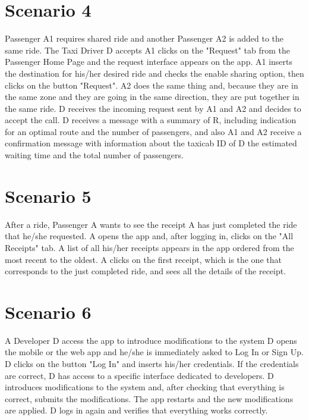 \section{Scenario 4}
Passenger A1 requires shared ride and another Passenger A2 is added to the same ride. The Taxi Driver D accepts A1 clicks on the "Request" tab from the Passenger Home Page and the request interface appears on the app. A1 inserts the destination for his/her desired ride and checks the enable sharing option, then clicks on the button "Request". A2 does the same thing and, because they are in the same zone and they are going in the same direction, they are put together in the same ride. D receives the incoming request sent by A1 and A2 and decides to accept the call. D receives a message with a summary of R, including indication for an optimal route and the number of passengers, and also A1 and A2 receive a confirmation message with information about the taxicab ID of D the estimated waiting time and the total number of passengers.

\section{Scenario 5}
After a ride, Passenger A wants to see the receipt A has just completed the ride that he/she requested. A opens the app and, after logging in, clicks on the "All Receipts" tab. A list of all his/her receipts appears in the app ordered from the most recent to the oldest. A clicks on the first receipt, which is the one that corresponds to the just completed ride, and sees all the details of the receipt.

\section{Scenario 6}
A Developer D access the app to introduce modifications to the system D opens the mobile or the web app and he/she is immediately asked to Log In or Sign Up. D clicks on the button "Log In" and inserts his/her credentials. If the credentials are correct, D has access to a specific interface dedicated to developers. D introduces modifications to the system and, after checking that everything is correct, submits the modifications. The app restarts and the new modifications are applied. D logs in again and verifies that everything works correctly.
